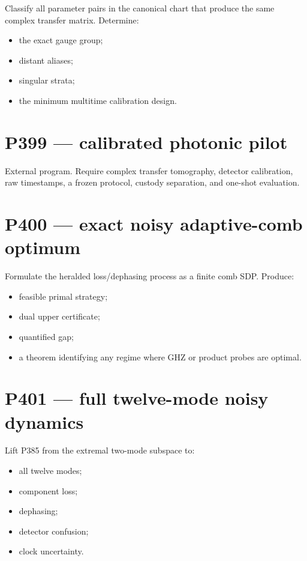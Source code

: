 \documentclass[11pt,a4paper,openany]{report}
\begin{document}
Classify all parameter pairs in the canonical chart that produce the same complex transfer matrix. Determine:

\begin{itemize}
\item 
the exact gauge group;

\item 
distant aliases;

\item 
singular strata;

\item 
the minimum multitime calibration design.

\end{itemize}

\section{P399 --- calibrated photonic pilot}

External program. Require complex transfer tomography, detector calibration, raw timestamps, a frozen protocol, custody separation, and one-shot evaluation.

\section{P400 --- exact noisy adaptive-comb optimum}

Formulate the heralded loss/\allowbreak{}dephasing process as a finite comb SDP. Produce:

\begin{itemize}
\item 
feasible primal strategy;

\item 
dual upper certificate;

\item 
quantified gap;

\item 
a theorem identifying any regime where GHZ or product probes are optimal.

\end{itemize}

\section{P401 --- full twelve-mode noisy dynamics}

Lift P385 from the extremal two-mode subspace to:

\begin{itemize}
\item 
all twelve modes;

\item 
component loss;

\item 
dephasing;

\item 
detector confusion;

\item 
clock uncertainty.

\end{itemize}
\end{document}

